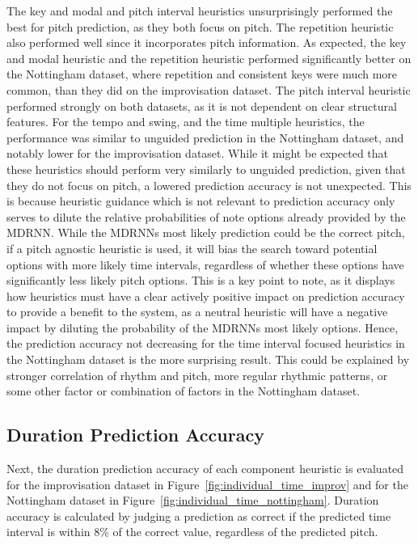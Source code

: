 The key and modal and pitch interval heuristics unsurprisingly performed the best for pitch prediction, as they both focus on pitch. The repetition heuristic also performed well since it incorporates pitch information. As expected, the key and modal heuristic and the repetition heuristic performed significantly better on the Nottingham dataset, where repetition and consistent keys were much more common, than they did on the improvisation dataset. The pitch interval heuristic performed strongly on both datasets, as it is not dependent on clear structural features. For the tempo and swing, and the time multiple heuristics, the performance was similar to unguided prediction in the Nottingham dataset, and notably lower for the improvisation dataset. While it might be expected that these heuristics should perform very similarly to unguided prediction, given that they do not focus on pitch, a lowered prediction accuracy is not unexpected. This is because heuristic guidance which is not relevant to prediction accuracy only serves to dilute the relative probabilities of note options already provided by the MDRNN. While the MDRNNs most likely prediction could be the correct pitch, if a pitch agnostic heuristic is used, it will bias the search toward potential options with more likely time intervals, regardless of whether these options have significantly less likely pitch options. This is a key point to note, as it displays how heuristics must have a clear actively positive impact on prediction accuracy to provide a benefit to the system, as a neutral heuristic will have a negative impact by diluting the probability of the MDRNNs most likely options. Hence, the prediction accuracy not decreasing for the time interval focused heuristics in the Nottingham dataset is the more surprising result. This could be explained by stronger correlation of rhythm and pitch, more regular rhythmic patterns, or some other factor or combination of factors in the Nottingham dataset.

\subsection{Duration Prediction Accuracy}

Next, the duration prediction accuracy of each component heuristic is evaluated for the improvisation dataset in Figure~\ref{fig:individual_time_improv} and for the Nottingham dataset in Figure~\ref{fig:individual_time_nottingham}. Duration accuracy is calculated by judging a prediction as correct if the predicted time interval is within 8\% of the correct value, regardless of the predicted pitch.

